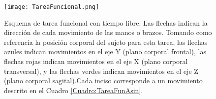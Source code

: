 \begin{figure}[htbp]
	\centering
	\texttt{[image: TareaFuncional.png]}
	\caption[Esquema de tarea funcional con tiempo libre.]{Esquema de tarea funcional con tiempo libre. Las flechas indican la dirección de cada movimiento de las manos o brazos. Tomando como referencia la posición corporal del sujeto para esta tarea, las flechas azules indican movimientos en el eje Y (plano corporal frontal), las flechas rojas indican movimientos en el eje X (plano corporal transversal), y las flechas verdes indican movimientos en el eje Z (plano corporal sagital).Cada inciso corresponde a un movimiento descrito en el Cuadro \ref{Cuadro:TareaFunAsin}.}
	\label{Figura: TareaFuncional_P}
\end{figure}
